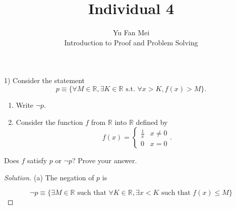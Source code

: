 \documentclass[12pt]{article}
\newenvironment{problem}[2][Problem]{\begin{trivlist}
\item[\hskip \labelsep {\bfseries #1}\hskip \labelsep {\bfseries #2.}]}{\end{trivlist}}
\newenvironment{solution}
               {\let\oldqedsymbol=\qedsymbol
                \renewcommand{\qedsymbol}{$\blacktriangleleft$}
                \begin{proof}[\textit\upshape Solution]}
               {\end{proof}
                \renewcommand{\qedsymbol}{\oldqedsymbol}}
\begin{document}

\title{Individual 4}%
\author{Yu Fan Mei\\ %
	Introduction to Proof and Problem Solving} %

\maketitle

\begin{problem}{12} %
    (1) Consider the statement
    $$p \equiv \{\forall M \in \mathbb{R}, \exists K \in \mathbb{R}\,\, \text{s.t.} \,\,\forall x > K,
    f(x) > M\}.$$
    \begin{enumerate}
    \item[(a)] Write $\neg p$.
    \item[(b)] Consider the function $f$ from $\mathbb{R}$ into $\mathbb{R}$ defined by
    $$f(x) = \begin{cases}
    \frac{1}{x} & x \neq 0\\
    0 & x = 0
    \end{cases}.$$
    \end{enumerate}
    Does $f$ satisfy $p$ or $\neg p$? Prove your answer.
    

\end{problem}

\begin{solution}

    (a) The negation of $p$ is

    $$\lnot p \equiv \{ \exists M \in \mathbb{R} \text{ such that } \forall K \in \mathbb{R}, \exists x < K \text{ such that } f(x) \leq M\}$$
\end{solution}
\end{document}
